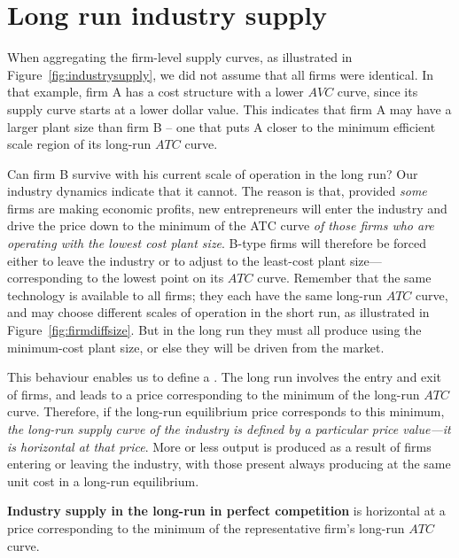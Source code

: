 \section{Long run industry supply}\label{sec:ch9sec5}

When aggregating the firm-level supply curves, as illustrated in Figure~\ref{fig:industrysupply}, we did not assume that all firms were identical. In that example, firm A has a cost structure with a lower $AVC$ curve, since its supply curve starts at a lower dollar value. This indicates that firm A may have a larger plant size than firm B -- one that puts A closer to the minimum efficient scale region of its long-run $ATC$ curve. 

Can firm B survive with his current scale of operation in the long run? Our industry dynamics indicate that it cannot. The reason is that, provided \textit{some} firms are making economic profits, new entrepreneurs will enter the industry and drive the price down to the minimum of the ATC curve \textit{of those firms who are operating with the lowest cost plant size}. B-type firms will therefore be forced either to leave the industry or to adjust to the least-cost plant size---corresponding to the lowest point on its  $ATC$ curve. Remember that the same technology is available to all firms; they each have the same long-run $ATC$ curve, and may choose different scales of operation in the short run, as illustrated in Figure~\ref{fig:firmdiffsize}. But in the long run they must all produce using the minimum-cost plant size, or else they will be driven from the market.



This behaviour enables us to define a . The long run involves the entry and exit of firms, and leads to a price corresponding to the minimum of the long-run $ATC$ curve. Therefore, if the long-run equilibrium price corresponds to this minimum, \textit{the long-run supply curve of the industry is defined by a particular price value---it is horizontal at that price}. More or less output is produced as a result of firms entering or leaving the industry, with those present always producing at the same unit cost in a long-run equilibrium.

\begin{DefBox}
\textbf{Industry supply in the long-run in perfect competition} is horizontal at a price corresponding to the minimum of the representative firm's long-run $ATC$ curve.
\end{DefBox}

